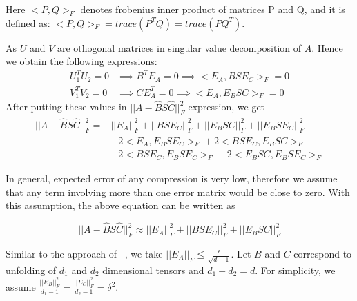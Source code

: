 \documentclass[runningheads]{llncs}
\begin{document}
\noindent Here $<P, Q>_F$ denotes frobenius inner product of matrices P and Q, and it is defined as: $<P, Q>_F = trace(P^TQ) = trace(PQ^T)$.

\noindent As $U$ and $V$ are othogonal matrices in singular value decomposition of $A$. Hence we obtain the following expressions:
\begin{align*}
U_1^TU_2 = 0 & \implies B^TE_A = 0 \implies <E_A, BSE_C>_F = 0\\
V_1^TV_2 = 0 & \implies CE_A^T = 0 \implies <E_A, E_BSC>_F = 0  
\end{align*}
After putting these values in $||A - \hat{B}S\hat{C}||_F^2$ expression, we get
\begin{align*}
||A - \hat{B} S \hat{C}||_F^2 =& ||E_A||_F^2 + ||BSE_C||_F^2 + ||E_BSC||_F^2 + ||E_BSE_C||_F^2 \\
& -2 <E_A, E_BSE_C>_F  + 2 <BSE_C, E_BSC>_F\\
& -2 <BSE_C, E_BSE_C>_F - 2<E_BSC, E_BSE_C>_F
\end{align*}

\noindent In general, expected error of any compression is very low, therefore we assume that any term involving more than one error matrix would be close to zero. With this assumption, the above equation can be written as

\begin{equation}\label{eq:approx}
||A - \hat{B} S \hat{C}||_F^2 \approx ||E_A||_F^2 + ||BSE_C||_F^2 + ||E_BSC||_F^2
\end{equation}


\noindent Similar to the approach of ~\cite{.}, we take $||E_A||_F \le \frac{\epsilon}{\sqrt{d-1}}$. Let $B$ and $C$ correspond to unfolding of $d_1$ and $d_2$ dimensional tensors and $d_1 + d_2 = d$. For simplicity, we  assume $\frac{||E_B||_F^2}{d_1-1} = \frac{||E_C||_F^2}{d_2-1} = \delta^2$.
\end{document}
